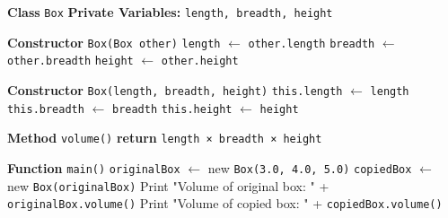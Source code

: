 \begin{algorithm}[H]
\caption{Box Volume Using Constructor Overloading}
\begin{algorithmic}[1]

\STATE \textbf{Class} \texttt{Box}
\STATE \hspace{1em} \textbf{Private Variables:} \texttt{length, breadth, height}

\STATE \hspace{1em} \textbf{Constructor} \texttt{Box(Box other)}
\STATE \hspace{2em} \texttt{length} $\gets$ \texttt{other.length}
\STATE \hspace{2em} \texttt{breadth} $\gets$ \texttt{other.breadth}
\STATE \hspace{2em} \texttt{height} $\gets$ \texttt{other.height}

\STATE \hspace{1em} \textbf{Constructor} \texttt{Box(length, breadth, height)}
\STATE \hspace{2em} \texttt{this.length} $\gets$ \texttt{length}
\STATE \hspace{2em} \texttt{this.breadth} $\gets$ \texttt{breadth}
\STATE \hspace{2em} \texttt{this.height} $\gets$ \texttt{height}

\STATE \hspace{1em} \textbf{Method} \texttt{volume()}
\STATE \hspace{2em} \textbf{return} \texttt{length × breadth × height}

\STATE

\STATE \textbf{Function} \texttt{main()}
\STATE \hspace{1em} \texttt{originalBox} $\gets$ new \texttt{Box(3.0, 4.0, 5.0)}
\STATE \hspace{1em} \texttt{copiedBox} $\gets$ new \texttt{Box(originalBox)}
\STATE \hspace{1em} Print "Volume of original box: " + \texttt{originalBox.volume()}
\STATE \hspace{1em} Print "Volume of copied box: " + \texttt{copiedBox.volume()}

\end{algorithmic}
\end{algorithm}